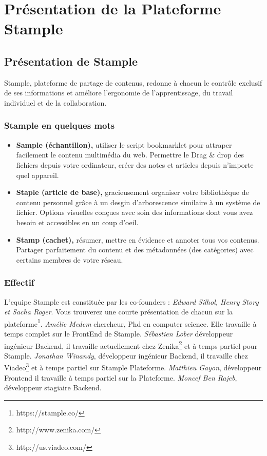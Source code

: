 \chapter{Présentation de la Plateforme Stample}
\section{Présentation de Stample}
Stample, plateforme de partage de contenus, redonne à chacun le contrôle exclusif de ses informations et améliore l'ergonomie de l'apprentissage, du travail individuel et de la collaboration.
\subsection{Stample en quelques mots}
\begin{itemize}
\item \textbf{Sample (échantillon),} utiliser le script bookmarklet pour attraper facilement le contenu multimédia du web. Permettre le Drag \& drop des fichiers depuis votre ordinateur, créer des notes et articles depuis n'importe quel appareil.
\item \textbf{Staple (article de base),} gracieusement organiser votre bibliothèque de contenu personnel grâce à un desgin d'arborescence similaire à un système de fichier.
Options visuelles conçues avec soin des informations dont vous avez besoin et accessibles en un coup d'oeil.
\item \textbf{Stamp (cachet),} résumer, mettre en évidence et annoter tous vos contenus.
Partager parfaitement du contenu et des métadonnées (des catégories) avec certains membres de votre réseau.
\end{itemize}
\newpage
\subsection{Effectif}
L'equipe Stample est constituée par les co-founders :
\textit{Edward Silhol, Henry Story et Sacha Roger}. Vous trouverez une courte présentation de chacun sur la plateforme\footnote{https://stample.co/}.\newline
\textit{Amélie Medem} chercheur, Phd en computer science. Elle travaille à temps complet sur le FrontEnd de Stample.\newline
\textit{Sébastien Lober} développeur ingénieur Backend, il travaille actuellement chez Zenika\footnote{http://www.zenika.com/} et à temps partiel pour Stample.\newline
\textit{Jonathan Winandy}, développeur ingénieur Backend, il travaille chez Viadeo\footnote{http://us.viadeo.com/} et à temps partiel sur Stample Plateforme.\newline
\textit{Matthieu Gayon}, développeur Frontend il travaille à temps partiel sur la Plateforme.\newline
\textit{Moncef Ben Rajeb}, développeur stagiaire Backend.
